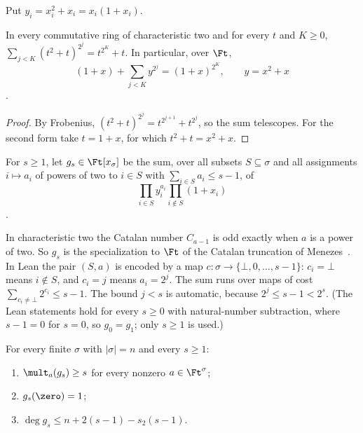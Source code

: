 Put \(y_i=x_i^2+x_i=x_i(1+x_i)\).

\begin{lemma}\label{lem:telescope}
In every commutative ring of characteristic two and for every \(t\) and \(K\ge0\),
\(\sum_{j<K}(t^2+t)^{2^j}=t^{2^K}+t\). In particular, over \(\Ft\),
\[
 (1+x)+\sum_{j<K}y^{2^j}=(1+x)^{2^K},\qquad y=x^2+x
\]
.
\end{lemma}

\begin{proof}
By Frobenius, \((t^2+t)^{2^j}=t^{2^{j+1}}+t^{2^j}\), so the sum telescopes. For the
second form take \(t=1+x\), for which \(t^2+t=x^2+x\).
\end{proof}

\begin{definition}\label{def:truncated}
For \(s\ge1\), let \(g_s\in\Ft[x_\sigma]\) be the sum, over all subsets
\(S\subseteq\sigma\) and all assignments \(i\mapsto a_i\) of powers of two to
\(i\in S\) with \(\sum_{i\in S}a_i\le s-1\), of
\[
 \prod_{i\in S}y_i^{a_i}\prod_{i\notin S}(1+x_i)
\]
.
\end{definition}

In characteristic two the Catalan number \(C_{a-1}\) is odd exactly when \(a\) is a
power of two. So \(g_s\) is the specialization to \(\Ft\) of the Catalan truncation
of Menezes~\cite[Section~3]{Men26}. In Lean the pair \((S,a)\) is encoded by a
map \(c:\sigma\to\{\bot,0,\ldots,s-1\}\): \(c_i=\bot\) means \(i\notin S\), and \(c_i=j\) means
\(a_i=2^j\). The sum runs over maps of cost \(\sum_{c_i\ne\bot}2^{c_i}\le s-1\).
The bound \(j<s\) is automatic, because \(2^j\le s-1<2^s\). (The Lean statements
hold for every \(s\ge0\) with natural-number subtraction, where \(s-1=0\) for
\(s=0\), so \(g_0=g_1\); only \(s\ge1\) is used.)

\begin{theorem}\label{thm:truncated-product}
For every finite \(\sigma\) with \(|\sigma|=n\) and every \(s\ge1\):
\begin{enumerate}
 \item \(\mult_a(g_s)\ge s\) for every nonzero \(a\in\Ft^\sigma\);
 \item \(g_s(\zero)=1\);
 \item \(\deg g_s\le n+2(s-1)-s_2(s-1)\).
\end{enumerate}
\end{theorem}

